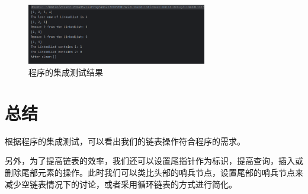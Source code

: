 \documentclass{ctexart}
\begin{document}
    \begin{figure}[h] %
        \centering
        \includegraphics[width=0.7\textwidth]{test2.png}
        \caption{程序的集成测试结果}
    \end{figure}
    
    \section{总结}
    根据程序的集成测试，可以看出我们的链表操作符合程序的需求。
    
    另外，为了提高链表的效率，我们还可以设置尾指针作为标识，提高查询，插入或删除尾部元素的操作。此时我们可以类比头部的哨兵节点，设置尾部的哨兵节点来减少空链表情况下的讨论，或者采用循环链表的方式进行简化。
    
    
\end{document}
